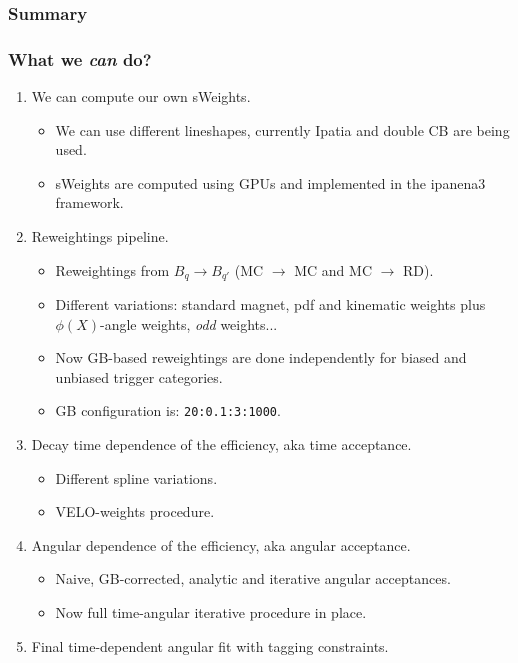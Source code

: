 \documentclass[9pt,aspectratio=43]{beamer}
\begin{document}
%
\begin{frame}[default]
\frametitle{Summary}
\frametitle{What we \textit{can} do?}

\begin{enumerate}
  \item We can compute our own sWeights.
    \begin{itemize}
      \item We can use different lineshapes, currently Ipatia and double CB are being used.
      \item sWeights are computed using GPUs and implemented in the ipanena3 framework.
    \end{itemize}
  \item Reweightings pipeline.
    \begin{itemize}
      \item Reweightings from $B_q \rightarrow B_{q'}$ (MC $\rightarrow$ MC and MC $\rightarrow$ RD).
      \item Different variations: standard magnet, pdf and kinematic weights plus $\phi(X)$-angle weights, \textit{odd} weights...
      \item Now GB-based reweightings are done independently for biased and unbiased trigger categories.
      \item GB configuration is: \texttt{20:0.1:3:1000}.
    \end{itemize}
  \addtocounter{enumi}{1}
  \item Decay time dependence of the efficiency, aka time acceptance.
    \begin{itemize}
      \item Different spline variations.
      \item VELO-weights procedure.
    \end{itemize}
  \addtocounter{enumi}{2}
  \item Angular dependence of the efficiency, aka angular acceptance.
    \begin{itemize}
      \item Naive, GB-corrected, analytic and iterative angular acceptances.
      \item Now full time-angular iterative procedure in place.
    \end{itemize}
  \item Final time-dependent angular fit with tagging constraints.
\end{enumerate}

\end{frame}
%
\end{document}
